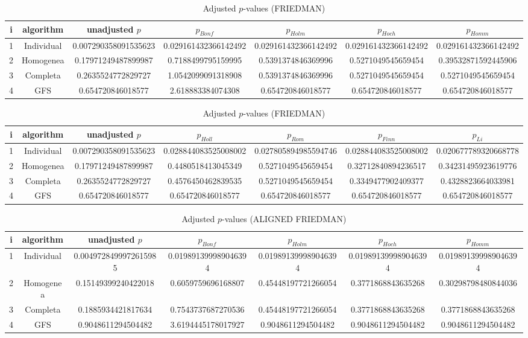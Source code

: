 \documentclass[a4paper,10pt]{article}
\begin{document}
\begin{landscape}
\begin{table}[!htp]
\centering\scriptsize
\caption{Adjusted $p$-values (FRIEDMAN)}
\begin{tabular}{ccccccc}
i&algorithm&unadjusted $p$&$p_{Bonf}$&$p_{Holm}$&$p_{Hoch}$&$p_{Homm}$\\
\hline
1&Individual&0.007290358091535623&0.029161432366142492&0.029161432366142492&0.029161432366142492&0.029161432366142492\\
2&Homogenea&0.17971249487899987&0.7188499795159995&0.5391374846369996&0.5271049545659454&0.39532871592445906\\
3&Completa&0.2635524772829727&1.0542099091318908&0.5391374846369996&0.5271049545659454&0.5271049545659454\\
4&GFS&0.654720846018577&2.618883384074308&0.654720846018577&0.654720846018577&0.654720846018577\\
\hline
\end{tabular}
\end{table}

\begin{table}[!htp]
\centering\scriptsize
\caption{Adjusted $p$-values (FRIEDMAN)}
\begin{tabular}{ccccccc}
i&algorithm&unadjusted $p$&$p_{Holl}$&$p_{Rom}$&$p_{Finn}$&$p_{Li}$\\
\hline
1&Individual&0.007290358091535623&0.028844083525008002&0.027805894985594746&0.028844083525008002&0.020677789320668778\\
2&Homogenea&0.17971249487899987&0.4480518413045349&0.5271049545659454&0.32712840894236517&0.34231495923619776\\
3&Completa&0.2635524772829727&0.4576450462839535&0.5271049545659454&0.3349477902409377&0.4328823664033981\\
4&GFS&0.654720846018577&0.654720846018577&0.654720846018577&0.654720846018577&0.654720846018577\\
\hline
\end{tabular}
\end{table}


\newpage

\begin{table}[!htp]
\centering\scriptsize
\caption{Adjusted $p$-values (ALIGNED FRIEDMAN)}
\begin{tabular}{ccccccc}
i&algorithm&unadjusted $p$&$p_{Bonf}$&$p_{Holm}$&$p_{Hoch}$&$p_{Homm}$\\
\hline
1&Individual&0.0049728499972615985&0.019891399989046394&0.019891399989046394&0.019891399989046394&0.019891399989046394\\
2&Homogenea&0.15149399240422018&0.6059759696168807&0.45448197721266054&0.3771868843635268&0.30298798480844036\\
3&Completa&0.1885934421817634&0.7543737687270536&0.45448197721266054&0.3771868843635268&0.3771868843635268\\
4&GFS&0.9048611294504482&3.6194445178017927&0.9048611294504482&0.9048611294504482&0.9048611294504482\\
\hline
\end{tabular}
\end{table}


\end{landscape}
\end{document}
